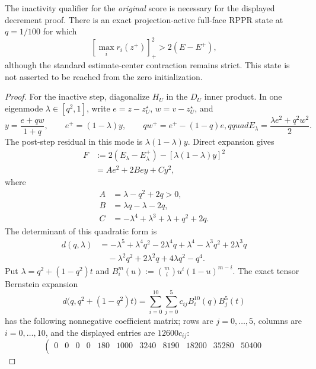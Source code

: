 \begin{proposition}
The inactivity qualifier for the \emph{original} score is necessary for the
displayed decrement proof.  There is an exact projection-active full-face
RPPR state at $q=1/100$ for which
\begin{equation}
 \left[\max_i r_i(z^+)\right]_+^2>2(E-E^+),
 \label{eq:original-score-projected-stop}
\end{equation}
although the standard estimate-center contraction remains strict.  This
state is not asserted to be reached from the zero initialization.
\end{proposition}

\begin{proof}
For the inactive step, diagonalize $H_U$ in the $D_U$ inner product.  In one
eigenmode $\lambda\in[q^2,1]$, write $e=z-z_U^\star$,
$w=v-z_U^\star$, and
\begin{equation*}
 y=\frac{e+qw}{1+q},\qquad
 e^+=(1-\lambda)y,\qquad
 qw^+=e^+-(1-q)e,qquad
 E_\lambda=\frac{\lambda e^2+q^2w^2}{2}.
\end{equation*}
The post-step residual in this mode is $\lambda(1-\lambda)y$.  Direct
expansion gives
\begin{align*}
 F&:=2(E_\lambda-E_\lambda^+)
       -[\lambda(1-\lambda)y]^2\\
  &=Ae^2+2Bey+Cy^2,
\end{align*}
where
\begin{align*}
 A&=\lambda-q^2+2q>0,\\
 B&=\lambda q-\lambda-2q,\\
 C&=-\lambda^4+\lambda^3+\lambda+q^2+2q.
\end{align*}
The determinant of this quadratic form is
\begin{align*}
 d(q,\lambda)
 &=-\lambda^5+\lambda^4q^2-2\lambda^4q+\lambda^4
   -\lambda^3q^2+2\lambda^3q\\
 &\quad-\lambda^2q^2+2\lambda^2q+4\lambda q^2-q^4.
\end{align*}
Put $\lambda=q^2+(1-q^2)t$ and
$B_i^m(u):=\binom miu^i(1-u)^{m-i}$.  The exact tensor Bernstein expansion
\begin{equation*}
 d\bigl(q,q^2+(1-q^2)t\bigr)
 =\sum_{i=0}^{10}\sum_{j=0}^{5}c_{ij}B_i^{10}(q)B_j^5(t)
\end{equation*}
has the following nonnegative coefficient matrix; rows are $j=0,\ldots,5$,
columns are $i=0,\ldots,10$, and the displayed entries are $12600c_{ij}$:
\begin{equation*}
\left(
\begin{array}{rrrrrrrrrrr}
0&0&0&0&180&1000&3240&8190&18200&35280&50400\\

\end{array}
\end{equation*}
\end{proof}
